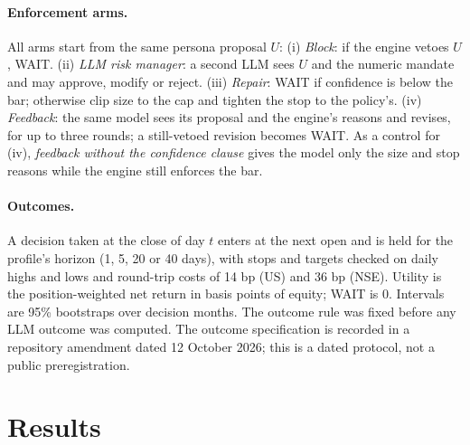 \documentclass[letterpaper]{article} %
\begin{document}
\paragraph{Enforcement arms.} All arms start from the same persona proposal $U$:
(i) \emph{Block}: if the engine vetoes $U$, WAIT.
(ii) \emph{LLM risk manager}: a second LLM sees $U$ and the numeric mandate and may approve, modify or reject.
(iii) \emph{Repair}: WAIT if confidence is below the bar; otherwise clip size to the cap and tighten the stop to the policy's.
(iv) \emph{Feedback}: the same model sees its proposal and the engine's reasons and revises, for up to three rounds; a still-vetoed revision becomes WAIT.
As a control for (iv), \emph{feedback without the confidence clause} gives the model only the size and stop reasons while the engine still enforces the bar.

\paragraph{Outcomes.} A decision taken at the close of day $t$ enters at the next open and is held for the profile's horizon (1, 5, 20 or 40 days), with stops and targets checked on daily highs and lows and round-trip costs of 14 bp (US) and 36 bp (NSE). Utility is the position-weighted net return in basis points of equity; WAIT is 0. Intervals are 95\% bootstraps over decision months. The outcome rule was fixed before any LLM outcome was computed. The outcome specification is recorded in a repository amendment dated 12 October 2026; this is a dated protocol, not a public preregistration.

\section{Results}
\begin{table}[t]
\centering
\footnotesize

\caption{Enforcement on text-persona proposals (\NPersona{} decisions, three models pooled, primary window). Viol.: executed size above the profile cap. Kept: share of the LLM's proposed trades still executed. Exp./cap: mean position over the cap (WAIT = 0). Aggr./Cons.: mean aggressive-profile position over mean conservative-profile position on the same bundles (the mandate implies 4.0). SD, CVaR$_5$ and mean are decision P\&L in bp of equity, net of costs. ``Limits stated in prompt'' and ``Code only'' are separate decisions on the same bundles, shown for reference.}
\label{tab:enforcement}
\end{table}
\end{document}
